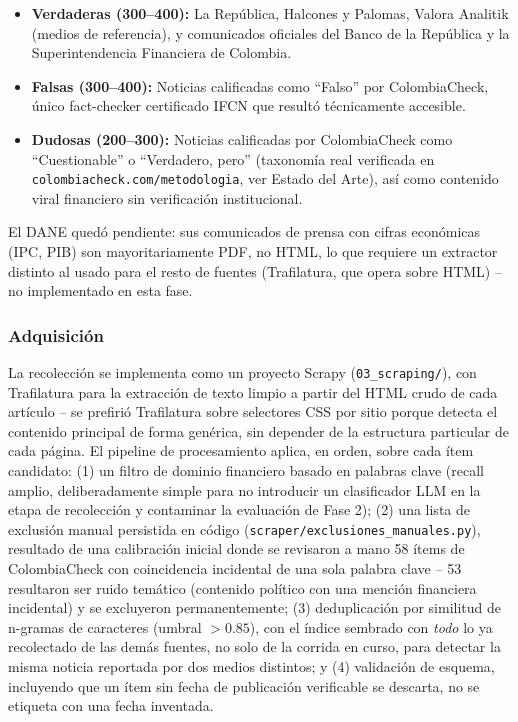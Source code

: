 \begin{itemize}
    \item \textbf{Verdaderas (300--400):} La República, Halcones y Palomas, Valora Analitik (medios de referencia), y comunicados oficiales del Banco de la República y la Superintendencia Financiera de Colombia.
    \item \textbf{Falsas (300--400):} Noticias calificadas como ``Falso'' por ColombiaCheck, único fact-checker certificado IFCN que resultó técnicamente accesible.
    \item \textbf{Dudosas (200--300):} Noticias calificadas por ColombiaCheck como ``Cuestionable'' o ``Verdadero, pero'' (taxonomía real verificada en \texttt{colombiacheck.com/metodologia}, ver Estado del Arte), así como contenido viral financiero sin verificación institucional.
\end{itemize}

El DANE quedó pendiente: sus comunicados de prensa con cifras económicas (IPC, PIB) son mayoritariamente PDF, no HTML, lo que requiere un extractor distinto al usado para el resto de fuentes (Trafilatura, que opera sobre HTML) -- no implementado en esta fase.

\subsubsection{Adquisición}

La recolección se implementa como un proyecto Scrapy (\texttt{03\_scraping/}), con Trafilatura para la extracción de texto limpio a partir del HTML crudo de cada artículo -- se prefirió Trafilatura sobre selectores CSS por sitio porque detecta el contenido principal de forma genérica, sin depender de la estructura particular de cada página. El pipeline de procesamiento aplica, en orden, sobre cada ítem candidato: (1) un filtro de dominio financiero basado en palabras clave (recall amplio, deliberadamente simple para no introducir un clasificador LLM en la etapa de recolección y contaminar la evaluación de Fase 2); (2) una lista de exclusión manual persistida en código (\texttt{scraper/exclusiones\_manuales.py}), resultado de una calibración inicial donde se revisaron a mano 58 ítems de ColombiaCheck con coincidencia incidental de una sola palabra clave -- 53 resultaron ser ruido temático (contenido político con una mención financiera incidental) y se excluyeron permanentemente; (3) deduplicación por similitud de n-gramas de caracteres (umbral $>0.85$), con el índice sembrado con \emph{todo} lo ya recolectado de las demás fuentes, no solo de la corrida en curso, para detectar la misma noticia reportada por dos medios distintos; y (4) validación de esquema, incluyendo que un ítem sin fecha de publicación verificable se descarta, no se etiqueta con una fecha inventada.

